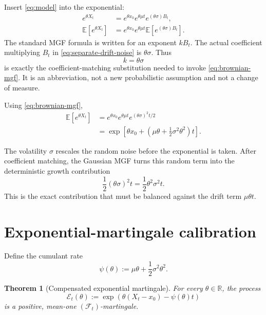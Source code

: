 \documentclass[10pt,a4paper]{article}
\numberwithin{equation}{section}
\theoremstyle{blueplain}
\newtheorem{theorem}{Theorem}[section]
\theoremstyle{definition}
\newcommand{\E}{\mathbb E}
\newcommand{\R}{\mathbb R}
\newcommand{\F}{\mathcal F}
\begin{document}
Insert \eqref{eq:model} into the exponential:
\begin{align}
  e^{\theta X_t}
  &=e^{\theta x_0}e^{\theta\mu t}e^{(\theta\sigma)B_t},\\
  \E[e^{\theta X_t}]
  &=e^{\theta x_0}e^{\theta\mu t}
    \E[e^{(\theta\sigma)B_t}].
  \label{eq:separate-drift-noise}
\end{align}
The standard MGF formula is written for an exponent \(kB_t\).  The actual
coefficient multiplying \(B_t\) in \eqref{eq:separate-drift-noise} is
\(\theta\sigma\).  Thus
\begin{equation}
  \boxed{k=\theta\sigma}
  \label{eq:k-substitution}
\end{equation}
is exactly the coefficient-matching substitution needed to invoke
\eqref{eq:brownian-mgf}.  It is an abbreviation, not a new probabilistic
assumption and not a change of measure.

Using \eqref{eq:brownian-mgf},
\begin{align}
  \E[e^{\theta X_t}]
  &=e^{\theta x_0}e^{\theta\mu t}
    e^{(\theta\sigma)^2t/2}\\
  &=\exp\!\left[
      \theta x_0+\left(\mu\theta+\frac12\sigma^2\theta^2\right)t
    \right].
  \label{eq:X-mgf}
\end{align}

\begin{keybox}
The volatility \(\sigma\) rescales the random noise before the exponential is
taken.  After coefficient matching, the Gaussian MGF turns this random term
into the deterministic growth contribution
\[
  \frac12(\theta\sigma)^2t=\frac12\theta^2\sigma^2t.
\]
This is the exact contribution that must be balanced against the drift term
\(\mu\theta t\).
\end{keybox}

\section{Exponential-martingale calibration}

Define the cumulant rate
\begin{equation}
  \psi(\theta):=\mu\theta+\frac12\sigma^2\theta^2.
  \label{eq:cumulant-rate}
\end{equation}

\begin{theorem}[Compensated exponential martingale]
For every \(\theta\in\R\), the process
\begin{equation}
  \mathcal E_t(\theta)
  :=\exp\!\left(
       \theta(X_t-x_0)-\psi(\theta)t
     \right)
  \label{eq:compensated-martingale}
\end{equation}
is a positive, mean-one \((\F_t)\)-martingale.
\end{theorem}
\end{document}

